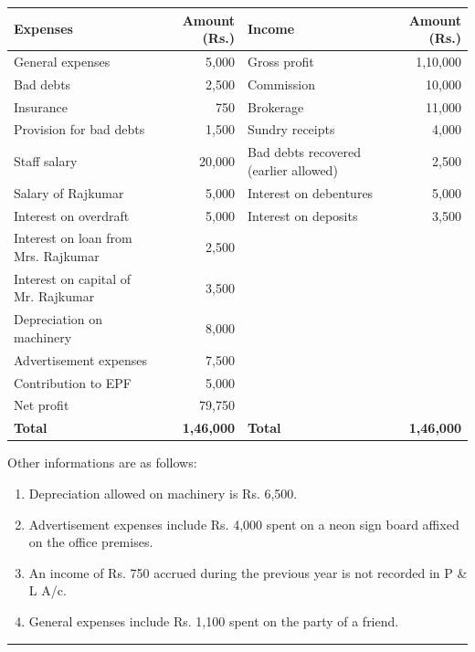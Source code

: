 \documentclass[11pt,a4paper]{article}
\begin{document}
\begin{center}
\renewcommand{\arraystretch}{1.2}

\begin{tabular}{|l|r|l|r|}
\hline
   \textbf{Expenses} &   \textbf{Amount (Rs.)} &   \textbf{Income} &   \textbf{Amount (Rs.)} \\ \hline
General expenses & 5,000 & Gross profit & 1,10,000 \\
Bad debts & 2,500 & Commission & 10,000 \\
Insurance & 750 & Brokerage & 11,000 \\
Provision for bad debts & 1,500 & Sundry receipts & 4,000 \\
Staff salary & 20,000 & Bad debts recovered (earlier allowed) & 2,500 \\
Salary of Rajkumar & 5,000 & Interest on debentures & 5,000 \\
Interest on overdraft & 5,000 & Interest on deposits & 3,500 \\
Interest on loan from Mrs. Rajkumar & 2,500 & & \\
Interest on capital of Mr. Rajkumar & 3,500 & & \\
Depreciation on machinery & 8,000 & & \\
Advertisement expenses & 7,500 & & \\
Contribution to EPF & 5,000 & & \\
Net profit & 79,750 & & \\ \hline
   \textbf{Total} &   \textbf{1,46,000} &   \textbf{Total} &   \textbf{1,46,000} \\ \hline
\end{tabular}
\end{center}

Other informations are as follows:

\begin{enumerate}[label=(\roman*),itemsep=2pt,topsep=2pt]
  \item Depreciation allowed on machinery is Rs. 6,500.
  \item Advertisement expenses include Rs. 4,000 spent on a neon sign board affixed on the office premises.
  \item An income of Rs. 750 accrued during the previous year is not recorded in P \& L A/c.
  \item General expenses include Rs. 1,100 spent on the party of a friend.
\end{enumerate}

\medskip\rule{\linewidth}{0.2pt}
\end{document}
